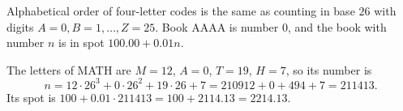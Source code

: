 Alphabetical order of four-letter codes is the same as counting in base $26$ with digits $A=0,B=1,\dots,Z=25$. Book AAAA is number $0$, and the book with number $n$ is in spot $100.00+0.01n$.

The letters of MATH are $M=12$, $A=0$, $T=19$, $H=7$, so its number is
\[
n=12\cdot26^3+0\cdot26^2+19\cdot26+7=210912+0+494+7=211413 .
\]
Its spot is $100+0.01\cdot211413=100+2114.13=\boxed{2214.13}$.
